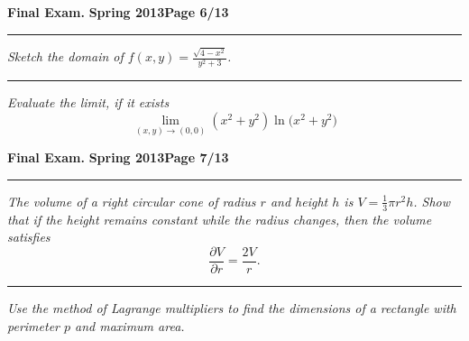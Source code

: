 \documentclass[12pt]{article}
\begin{document}
\newpage

\hfill{\large\bf Final Exam.}\hfill{\large\bf
  Spring 2013}\hfill{\large\bf Page 6/13}\hrule

\bigskip
{\problem[15 pts] \em  Sketch the domain of $f(x,y)=\displaystyle{\frac{\sqrt{4-x^2}}{y^2+3}}$.}
\vspace{11.5cm}
\hrule
{\problem[15 pts] \em Evaluate the limit, if it exists}
\begin{equation*}
\lim_{(x,y) \to (0,0)} (x^2+y^2) \ln \big( x^2 + y^2 \big)
\end{equation*}
\vspace{6.5cm}
\begin{flushright}
\end{flushright}
\newpage

\hfill{\large\bf Final Exam.}\hfill{\large\bf
  Spring 2013}\hfill{\large\bf Page 7/13}\hrule

\bigskip
{\problem[15 pts] \em The volume of a right circular cone of radius $r$ and height $h$ is $V = \tfrac{1}{3}\pi r^2h$.  Show that if the height remains constant while the radius changes, then the volume satisfies}
\begin{equation*}
\frac{\partial V}{\partial r} = \frac{2V}{r}.
\end{equation*}
\vspace{10.5cm}
\hrule
{\problem[10 pts] \em Use the method of Lagrange multipliers to find the
dimensions of a rectangle with perimeter $p$ and maximum area.}
\vspace{4.5cm}
\begin{flushright}
\end{flushright}
\newpage
\end{document}
